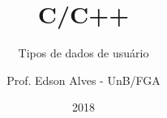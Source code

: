 \title{C/C++}
\subtitle{Tipos de dados de usuário}
\author{Prof. Edson Alves - UnB/FGA}
\date{2018}
